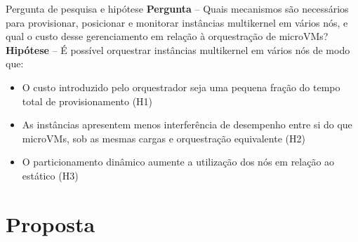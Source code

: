 \documentclass[aspectratio=169]{beamer}
\begin{document}
{%
        \begin{frame}{Pergunta de pesquisa e hipótese}
            \small
            \textbf{Pergunta} -- Quais mecanismos são necessários para provisionar, posicionar e monitorar instâncias
            multikernel em vários nós,
            e qual o custo desse gerenciamento em relação à orquestração de microVMs?\\
            \vspace{10mm}
            \textbf{Hipótese} -- É possível orquestrar instâncias multikernel em vários nós de modo que:
            \begin{itemize}
                \item O custo introduzido pelo orquestrador seja uma pequena fração do tempo total de provisionamento (H1)
                \item As instâncias apresentem menos interferência de desempenho entre si do que microVMs, sob as mesmas
                cargas e orquestração equivalente (H2)
                \item O particionamento dinâmico aumente a utilização dos nós em relação ao estático (H3)
            \end{itemize}
        \end{frame}

        \section{Proposta}

}
\end{document}
